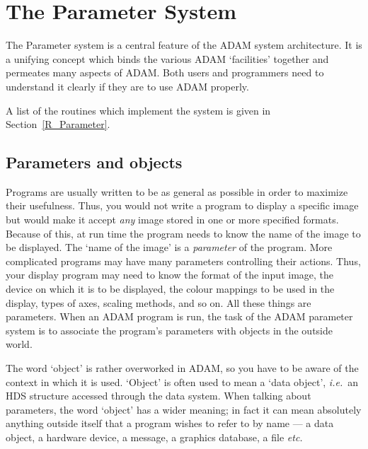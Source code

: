 \chapter{The Parameter System}
\label{C_parsys}

The Parameter system is a central feature of the ADAM system architecture.
It is a unifying concept which binds the various ADAM `facilities' together
and permeates many aspects of ADAM.
Both users and programmers need to understand it clearly if they are to use
ADAM properly.

A list of the routines which implement the system is given in
Section~\ref{R_Parameter}.

\section{Parameters and objects}

Programs are usually written to be as general as possible in order to maximize
their usefulness.
Thus, you would not write a program to display a specific image but would make
it accept {\em any} image stored in one or more specified formats.
Because of this, at run time the program needs to know the name of the image
to be displayed.
The `name of the image' is a {\em parameter} of the program.
More complicated programs may have many parameters controlling their actions.
Thus, your display program may need to know the format of the input image, 
the device on which it is to be displayed, the colour mappings to be used in
the display, types of axes, scaling methods, and so on.
All these things are parameters.
When an ADAM program is run, the task of the ADAM parameter system is to
associate the program's parameters with objects in the outside world.

The word `object' is rather overworked in ADAM, so you have to be aware of the
context in which it is used.
`Object' is often used to mean a `data object', {\em i.e.}\, an HDS structure
accessed through the data system.
When talking about parameters, the word `object' has a wider meaning;
in fact it can mean absolutely anything outside itself that a program wishes
to refer to by name --- a data object, a hardware device, a message, a graphics
database, a file {\em etc.}


